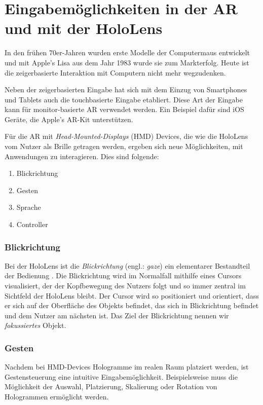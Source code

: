 \section{Eingabemöglichkeiten in der AR und mit der HoloLens}
\label{sec:interaction-hololens}

In den frühen 70er-Jahren wurden erste Modelle der Computermaus entwickelt und mit Apple's Lisa aus dem Jahr 1983 wurde sie zum Markterfolg. Heute ist die zeigerbasierte Interaktion mit Computern nicht mehr wegzudenken.

Neben der zeigerbasierten Eingabe hat sich mit dem Einzug von Smartphones und Tablets auch die touchbasierte Eingabe etabliert. Diese Art der Eingabe kann für monitor-basierte AR verwendet werden. Ein Beispiel dafür sind iOS Geräte, die Apple's AR-Kit unterstützen.

Für die AR mit \textit{Head-Mounted-Displays} (HMD) Devices, die wie die HoloLens vom Nutzer als Brille getragen werden, ergeben sich neue Möglichkeiten, mit Anwendungen zu interagieren. Dies sind folgende:

\begin{enumerate}
  \item Blickrichtung
  \item Gesten
  \item Sprache
  \item Controller
\end{enumerate}

\subsubsection*{Blickrichtung}
Bei der HoloLens ist die \textit{Blickrichtung} (engl.: \textit{gaze}) ein elementarer Bestandteil der Bedienung \cite{windows2017interaction}. Die Blickrichtung wird im Normalfall mithilfe eines Cursors visualisiert, der der Kopfbewegung des Nutzers folgt und so immer zentral im Sichtfeld der HoloLens bleibt. Der Cursor wird so positioniert und orientiert, dass er sich auf der Oberfläche des Objekts befindet, das sich in Blickrichtung befindet und dem Nutzer am nächsten ist. Das Ziel der Blickrichtung nennen wir \textit{fokussiertes} Objekt.

\subsubsection*{Gesten}
Nachdem bei HMD-Devices Hologramme im realen Raum platziert werden, ist Gestensteuerung eine intuitive Eingabemöglichkeit. Beispielsweise muss die Möglichkeit der Auswahl, Platzierung, Skalierung oder Rotation von Hologrammen ermöglicht werden.

